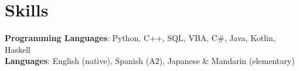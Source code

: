 \section{Skills}
\begin{itemize}[leftmargin=0.15in, label={}]
\small{\item{
    \textbf{Programming Languages}{: Python, C++, SQL, VBA, C#, Java, Kotlin, Haskell} \\
    \textbf{Languages}{: English (native), Spanish (A2), Japanese \& Mandarin (elementary)} \\
}}
\end{itemize}

